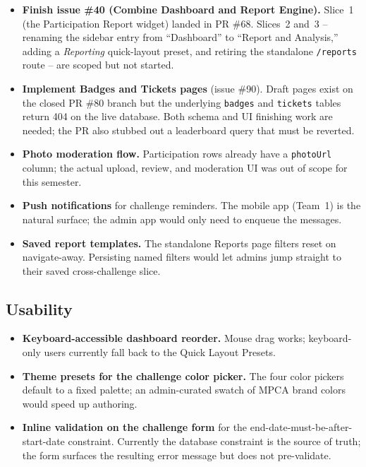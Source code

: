\documentclass[11pt,letterpaper]{article}
\begin{document}
\begin{itemize}
  \item \textbf{Finish issue \#40 (Combine Dashboard and Report Engine).}
        Slice~1 (the Participation Report widget) landed in PR \#68.
        Slices~2 and~3 -- renaming the sidebar entry from
        ``Dashboard'' to ``Report and Analysis,'' adding a
        \emph{Reporting} quick-layout preset, and retiring the
        standalone \texttt{/reports} route -- are scoped but not
        started.
  \item \textbf{Implement Badges and Tickets pages} (issue \#90).
        Draft pages exist on the closed PR \#80 branch but the
        underlying \texttt{badges} and \texttt{tickets} tables
        return 404 on the live database. Both schema and UI
        finishing work are needed; the PR also stubbed out a
        leaderboard query that must be reverted.
  \item \textbf{Photo moderation flow.} Participation rows already
        have a \texttt{photoUrl} column; the actual upload, review,
        and moderation UI was out of scope for this semester.
  \item \textbf{Push notifications} for challenge reminders. The
        mobile app (Team~1) is the natural surface; the admin app
        would only need to enqueue the messages.
  \item \textbf{Saved report templates.} The standalone Reports
        page filters reset on navigate-away. Persisting named
        filters would let admins jump straight to their saved
        cross-challenge slice.
\end{itemize}

\subsection{Usability}

\begin{itemize}
  \item \textbf{Keyboard-accessible dashboard reorder.} Mouse drag
        works; keyboard-only users currently fall back to the
        Quick Layout Presets.
  \item \textbf{Theme presets for the challenge color picker.}
        The four color pickers default to a fixed palette; an
        admin-curated swatch of MPCA brand colors would speed
        up authoring.
  \item \textbf{Inline validation on the challenge form} for the
        end-date-must-be-after-start-date constraint. Currently
        the database constraint is the source of truth; the form
        surfaces the resulting error message but does not
        pre-validate.
\end{itemize}
\end{document}
